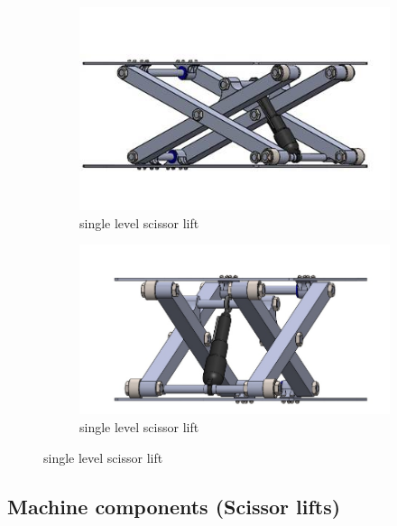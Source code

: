 \documentclass[../../main]{subfiles}
\begin{document}
\begin{figure}
\centering
\begin{subfigure}[b]{0.45\textwidth}
  \includegraphics[width=\textwidth]{img/image082.jpg}
  \caption{single level scissor lift}
\end{subfigure}
\hfil
\begin{subfigure}[b]{0.45\textwidth}
  \includegraphics[width=\textwidth]{img/image083.jpg}
  \caption{single level scissor lift}
\end{subfigure}
\end{figure}
\newpage
\subsection{Machine components (Scissor
lifts)}\label{machine-components-scissor-lifts}
\end{document}
